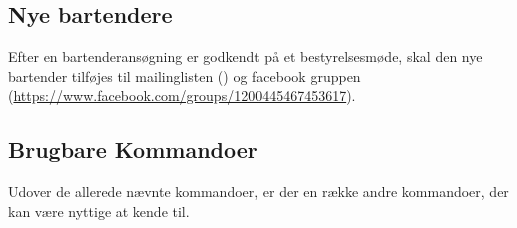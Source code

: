 \subsection{Nye bartendere}
\label{sec:nye-bartendere}

Efter en bartenderansøgning er godkendt på et bestyrelsesmøde, skal den nye bartender tilføjes til
mailinglisten () og facebook gruppen 
(\url{https://www.facebook.com/groups/1200445467453617}).

\subsection{Brugbare Kommandoer}
\label{sec:brugbare-kommandoer}

Udover de allerede nævnte kommandoer, er der en række andre kommandoer, der kan være nyttige at kende til.

